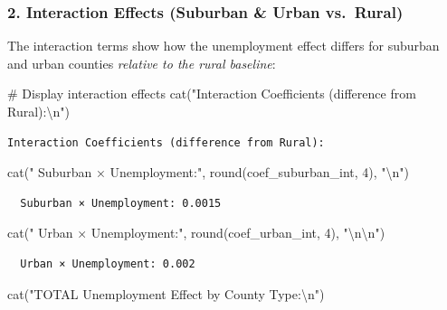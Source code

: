 \documentclass[
  11pt,
]{article}
\newenvironment{Shaded}{\begin{snugshade}}{\end{snugshade}}
\newcommand{\CommentTok}[1]{\textcolor[rgb]{0.37,0.37,0.37}{#1}}
\newcommand{\DecValTok}[1]{\textcolor[rgb]{0.68,0.00,0.00}{#1}}
\newcommand{\FunctionTok}[1]{\textcolor[rgb]{0.28,0.35,0.67}{#1}}
\newcommand{\NormalTok}[1]{\textcolor[rgb]{0.00,0.23,0.31}{#1}}
\newcommand{\SpecialCharTok}[1]{\textcolor[rgb]{0.37,0.37,0.37}{#1}}
\newcommand{\StringTok}[1]{\textcolor[rgb]{0.13,0.47,0.30}{#1}}
\begin{document}
\subsubsection{2. Interaction Effects (Suburban \& Urban
vs.~Rural)}\label{interaction-effects-suburban-urban-vs.-rural}

The interaction terms show how the unemployment effect differs for
suburban and urban counties \emph{relative to the rural baseline}:

\begin{Shaded}
\begin{Highlighting}[]
\CommentTok{\# Display interaction effects}
\FunctionTok{cat}\NormalTok{(}\StringTok{"Interaction Coefficients (difference from Rural):}\SpecialCharTok{\textbackslash{}n}\StringTok{"}\NormalTok{)}
\end{Highlighting}
\end{Shaded}

\begin{verbatim}
Interaction Coefficients (difference from Rural):
\end{verbatim}

\begin{Shaded}
\begin{Highlighting}[]
\FunctionTok{cat}\NormalTok{(}\StringTok{"  Suburban × Unemployment:"}\NormalTok{, }\FunctionTok{round}\NormalTok{(coef\_suburban\_int, }\DecValTok{4}\NormalTok{), }\StringTok{"}\SpecialCharTok{\textbackslash{}n}\StringTok{"}\NormalTok{)}
\end{Highlighting}
\end{Shaded}

\begin{verbatim}
  Suburban × Unemployment: 0.0015 
\end{verbatim}

\begin{Shaded}
\begin{Highlighting}[]
\FunctionTok{cat}\NormalTok{(}\StringTok{"  Urban × Unemployment:"}\NormalTok{, }\FunctionTok{round}\NormalTok{(coef\_urban\_int, }\DecValTok{4}\NormalTok{), }\StringTok{"}\SpecialCharTok{\textbackslash{}n\textbackslash{}n}\StringTok{"}\NormalTok{)}
\end{Highlighting}
\end{Shaded}

\begin{verbatim}
  Urban × Unemployment: 0.002 
\end{verbatim}

\begin{Shaded}
\begin{Highlighting}[]
\FunctionTok{cat}\NormalTok{(}\StringTok{"TOTAL Unemployment Effect by County Type:}\SpecialCharTok{\textbackslash{}n}\StringTok{"}\NormalTok{)}
\end{Highlighting}
\end{Shaded}
\end{document}
